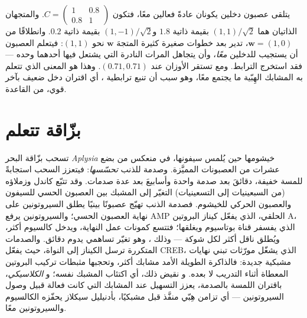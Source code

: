 \begin{example}[دخلان]\label{ex:b3:learning-memory:two-inputs}
يتلقى عصبون دخلين يكونان عادةً فعالين معًا، فتكون $C =
\begin{pmatrix} 1 & 0.8 \\ 0.8 & 1\end{pmatrix}$. والمتجهان الذاتيان هما
$(1,1)/\sqrt{2}$ بقيمة ذاتية $1.8$ و$(1,-1)/\sqrt{2}$ بقيمة
ذاتية $0.2$. وانطلاقًا من $\mathbf{w} = (1, 0)$، تدير  بعد
خطوات صغيرة كثيرة المتجهَ $\mathbf{w}$ نحو $(1,1)$: فيتعلم العصبون
أن يستجيب للدخلين \emph{معًا}، وأن يتجاهل المرات النادرة
التي يشتعل فيها أحدهما وحده --- فقد استخرج الترابط.
ومع  تستقر الأوزان عند $(0.71, 0.71)$. وهذا هو
المعنى الذي تتعلم به المشابك الهِبّية ما يجتمع معًا، وهو سبب
أن تنبع ترابطية ، أي اقتران دخل ضعيف
بآخر قوي، من القاعدة.
\end{example}

\section{بزّاقة تتعلم}

\begin{proposition}\label{prop:b3:learning-memory:aplysia}
تسحب بزّاقة البحر \emph{Aplysia} خيشومها حين يُلمس سيفونها،
في منعكس من بضع عشرات من العصبونات المميَّزة. وصدمة للذنب
\emph{تحسّسها}: فيتعزز السحب استجابةً للمسة خفيفة، دقائقَ
بعد صدمة واحدة وأسابيعَ بعد عدة صدمات. وقد تتبّع كاندل
وزملاؤه (من السبعينيات إلى التسعينيات) التغيّر إلى المشبك
بين العصبون الحسي للسيفون والعصبون الحركي للخيشوم. فصدمة
الذنب تهيّج عصبونًا بينيًا يطلق السيروتونين على نهاية
العصبون الحسي؛ والسيروتونين يرفع AMP الحلقي، الذي يفعّل
كيناز البروتين A، الذي يفسفر قناة بوتاسيوم ويغلقها؛ فتتسع
كمونات عمل النهاية، ويدخل كالسيوم أكثر، ويُطلق ناقل أكثر
لكل شوكة --- وذلك \emph{}، وهو تغيّر
تساهمي يدوم دقائق. والصدمات المتكررة ترسل الكيناز إلى
النواة، حيث يفعّل CREB، الذي يشغّل مورّثات تبني نهايات
مشبكية جديدة: فالذاكرة الطويلة الأمد مشابك أكثر، وتحجبها
مثبطات تركيب البروتين المعطاة أثناء التدريب لا بعده.
و\emph{} نقيض ذلك، أي اكتئاب المشبك نفسه؛
و\emph{ الكلاسيكي}، باقتران اللمسة بالصدمة، يعزز
التسهيل عند المشابك التي كانت فعالة قبيل وصول السيروتونين
--- أي تزامن هِبّي منفَّذ قبل مشبكيًا، بأدنيليل سيكلاز
يحفّزه الكالسيوم والسيروتونين معًا.
\end{proposition}

